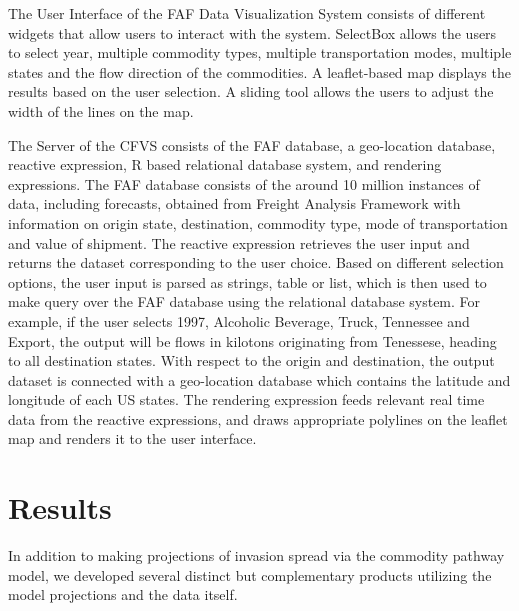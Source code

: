 \documentclass[12pt]{article}
\begin{document}
The User Interface of the FAF Data Visualization System consists of different widgets that allow users to interact with the system. SelectBox allows the users to select year, multiple commodity types, multiple transportation modes, multiple states and the flow direction of the commodities.  A leaflet-based map displays the results based on the user selection. A sliding tool allows the users to adjust the width of the lines on the map.  

The Server of the CFVS consists of the FAF database, a geo-location database, reactive expression, R based relational database system, and rendering expressions. The FAF database consists of the around 10 million instances of data, including forecasts, obtained from Freight Analysis Framework with information on origin state, destination, commodity type, mode of transportation and value of shipment. The reactive expression retrieves the user input and returns the dataset corresponding to the user choice. Based on different selection options, the user input is parsed as strings, table or list, which is then used to make query over the FAF database using the relational database system.  For example, if the user selects 1997, Alcoholic Beverage, Truck, Tennessee and Export, the output will be flows in kilotons originating from Tenessese, heading to all destination states. With respect to the origin and destination, the output dataset is connected with a geo-location database which contains the latitude and longitude of each US states.  The rendering expression feeds relevant real time data from the reactive expressions, and draws appropriate polylines on the leaflet map and renders it to the user interface.  

\section*{Results}

In addition to making projections of invasion spread via the commodity pathway model, we developed several distinct but complementary products utilizing the model projections and the data itself.
\end{document}
